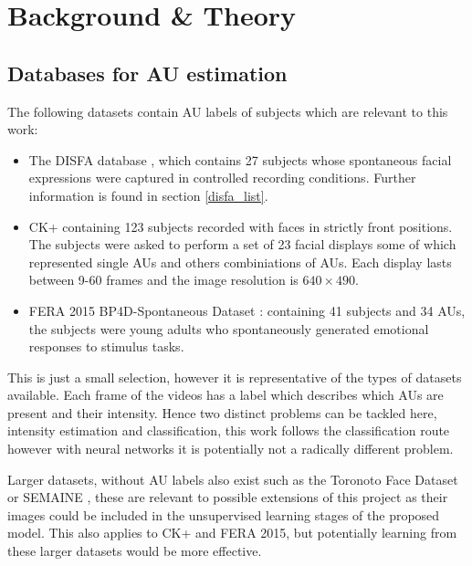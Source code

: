 \chapter{Background \& Theory}
  \section{Databases for AU estimation}
    The following datasets contain AU labels of subjects which are relevant to this work:

    \begin{itemize}
        \item The DISFA database \cite{disfa}, which contains 27 subjects whose spontaneous
              facial expressions were captured in controlled recording conditions. Further information is found in section \ref{disfa_list}.
        \item CK+ \cite{Lucey2010} containing 123 subjects recorded with faces in strictly front positions. The subjects were asked to perform a set of
              23 facial displays some of which represented single AUs and others combiniations of AUs. Each display lasts between 9-60 frames
              and the image resolution is $640\times 490$.
        \item FERA 2015 BP4D-Spontaneous Dataset \cite{Valstar}:
              containing 41 subjects and 34 AUs, the subjects were young adults who
              spontaneously generated emotional responses to stimulus tasks.
    \end{itemize}

    This is just a small selection, however it is representative of the types of
    datasets available. Each frame of the videos has a label which describes which AUs are
    present and their intensity. Hence two distinct problems can be tackled here, intensity
    estimation and classification, this work follows the classification route however
    with neural networks it is potentially not a radically different problem.

    Larger datasets, without AU labels also exist such as the Toronoto Face Dataset\cite{tfd}
    or SEMAINE \cite{semaine}, these are relevant to possible extensions of this project as their
    images could be included in the unsupervised learning stages of the proposed model. This also
    applies to CK+ and FERA 2015, but potentially learning from these larger datasets would
    be more effective.

